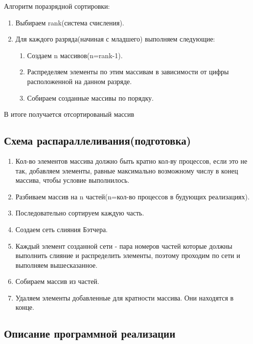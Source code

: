 \documentclass{report}
\begin{document}
Алгоритм поразрядной сортировки: 
\begin{enumerate}
\item Выбираем rank(система счисления).
\item Для каждого разряда(начиная с младшего) выполняем следующие:
\begin{enumerate}
\item Создаем n массивов(n=rank-1).
\item Распределяем элементы по этим массивам в зависимости от цифры расположенной на данном разряде.
\item Собираем созданные массивы по порядку.
\end{enumerate}
\end{enumerate}
В итоге получается отсортированый массив

\newpage
\begin{center}
\section*{Схема распараллеливания(подготовка)}
\end{center}

\begin{enumerate}
\item Кол-во элементов массива должно быть кратно кол-ву процессов, если это не так, добавляем элементы, равные максимально возможному числу в конец массива, чтобы условие выполнилось.
\item Разбиваем массив на n частей(n=кол-во процессов в будующих реализациях).
\item Последовательно сортируем каждую часть.
\item Создаем сеть слияния Бэтчера.
\item Каждый элемент созданной сети - пара номеров частей которые должны выполнить слияние и распределить элементы, поэтому проходим по сети и выполняем вышесказанное.
\item Собираем массив из частей.
\item Удаляем элементы добавленные для кратности массива. Они находятся в конце.
\end{enumerate}

\newpage
\begin{center}
\section*{Описание программной реализации}
\end{center}
\end{document}
